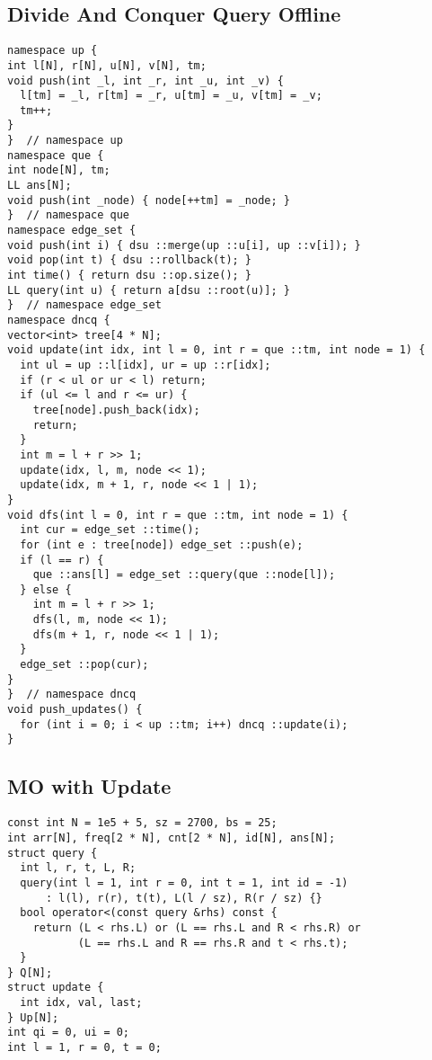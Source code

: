 \documentclass[FSZ,a4paper,onesided]{article}
\begin{document}
\begin{multicols*}{\COLS}
\subsection{Divide And Conquer Query Offline}
\begin{lstlisting}
namespace up {
int l[N], r[N], u[N], v[N], tm;
void push(int _l, int _r, int _u, int _v) {
  l[tm] = _l, r[tm] = _r, u[tm] = _u, v[tm] = _v;
  tm++;
}
}  // namespace up
namespace que {
int node[N], tm;
LL ans[N];
void push(int _node) { node[++tm] = _node; }
}  // namespace que
namespace edge_set {
void push(int i) { dsu ::merge(up ::u[i], up ::v[i]); }
void pop(int t) { dsu ::rollback(t); }
int time() { return dsu ::op.size(); }
LL query(int u) { return a[dsu ::root(u)]; }
}  // namespace edge_set
namespace dncq {
vector<int> tree[4 * N];
void update(int idx, int l = 0, int r = que ::tm, int node = 1) {
  int ul = up ::l[idx], ur = up ::r[idx];
  if (r < ul or ur < l) return;
  if (ul <= l and r <= ur) {
    tree[node].push_back(idx);
    return;
  }
  int m = l + r >> 1;
  update(idx, l, m, node << 1);
  update(idx, m + 1, r, node << 1 | 1);
}
void dfs(int l = 0, int r = que ::tm, int node = 1) {
  int cur = edge_set ::time();
  for (int e : tree[node]) edge_set ::push(e);
  if (l == r) {
    que ::ans[l] = edge_set ::query(que ::node[l]);
  } else {
    int m = l + r >> 1;
    dfs(l, m, node << 1);
    dfs(m + 1, r, node << 1 | 1);
  }
  edge_set ::pop(cur);
}
}  // namespace dncq
void push_updates() {
  for (int i = 0; i < up ::tm; i++) dncq ::update(i);
}
\end{lstlisting}
\subsection{MO with Update}
\begin{lstlisting}
const int N = 1e5 + 5, sz = 2700, bs = 25;
int arr[N], freq[2 * N], cnt[2 * N], id[N], ans[N];
struct query {
  int l, r, t, L, R;
  query(int l = 1, int r = 0, int t = 1, int id = -1)
      : l(l), r(r), t(t), L(l / sz), R(r / sz) {}
  bool operator<(const query &rhs) const {
    return (L < rhs.L) or (L == rhs.L and R < rhs.R) or
           (L == rhs.L and R == rhs.R and t < rhs.t);
  }
} Q[N];
struct update {
  int idx, val, last;
} Up[N];
int qi = 0, ui = 0;
int l = 1, r = 0, t = 0;


\end{lstlisting}
\end{multicols*}
\end{document}
